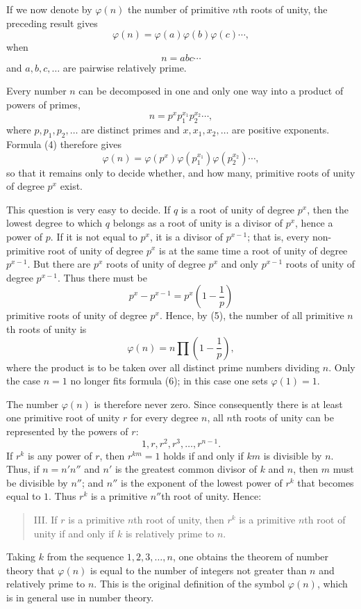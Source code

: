 \documentclass[11pt]{article}
\begin{document}
If we now denote by $\varphi(n)$ the number of primitive $n$th roots of unity, the preceding result gives
\[
\tag{4}        \varphi(n)=\varphi(a)\varphi(b)\varphi(c)\cdots,
\]
when
\[
        n=abc\cdots
\]
and $a,b,c,\ldots$ are pairwise relatively prime.

Every number $n$ can be decomposed in one and only one way into a product of powers of primes,
\[
        n=p^x p_1^{x_1}p_2^{x_2}\cdots,
\]
where $p,p_1,p_2,\ldots$ are distinct primes and $x,x_1,x_2,\ldots$ are positive exponents. Formula (4) therefore gives
\[
\tag{5}        \varphi(n)=\varphi(p^x)\varphi(p_1^{x_1})\varphi(p_2^{x_2})\cdots,
\]
so that it remains only to decide whether, and how many, primitive roots of unity of degree $p^x$ exist.

This question is very easy to decide. If $q$ is a root of unity of degree $p^x$, then the lowest degree to which $q$ belongs as a root of unity is a divisor of $p^x$, hence a power of $p$. If it is not equal to $p^x$, it is a divisor of $p^{x-1}$; that is, every non-primitive root of unity of degree $p^x$ is at the same time a root of unity of degree $p^{x-1}$. But there are $p^x$ roots of unity of degree $p^x$ and only $p^{x-1}$ roots of unity of degree $p^{x-1}$. Thus there must be
\[
        p^x-p^{x-1}=p^x\left(1-\frac1p\right)
\]
primitive roots of unity of degree $p^x$. Hence, by (5), the number of all primitive $n$th roots of unity is
\[
\tag{6}        \varphi(n)=n\prod\left(1-\frac1p\right),
\]
where the product is to be taken over all distinct prime numbers dividing $n$. Only the case $n=1$ no longer fits formula (6); in this case one sets $\varphi(1)=1$.

The number $\varphi(n)$ is therefore never zero. Since consequently there is at least one primitive root of unity $r$ for every degree $n$, all $n$th roots of unity can be represented by the powers of $r$:
\[
\tag{7}        1,r,r^2,r^3,\ldots,r^{n-1}.
\]
If $r^k$ is any power of $r$, then $r^{km}=1$ holds if and only if $km$ is divisible by $n$. Thus, if $n=n'n''$ and $n'$ is the greatest common divisor of $k$ and $n$, then $m$ must be divisible by $n''$; and $n''$ is the exponent of the lowest power of $r^k$ that becomes equal to $1$. Thus $r^k$ is a primitive $n''$th root of unity. Hence:
\begin{quote}
III. If $r$ is a primitive $n$th root of unity, then $r^k$ is a primitive $n$th root of unity if and only if $k$ is relatively prime to $n$.
\end{quote}
Taking $k$ from the sequence $1,2,3,\ldots,n$, one obtains the theorem of number theory that $\varphi(n)$ is equal to the number of integers not greater than $n$ and relatively prime to $n$. This is the original definition of the symbol $\varphi(n)$, which is in general use in number theory.
\end{document}

